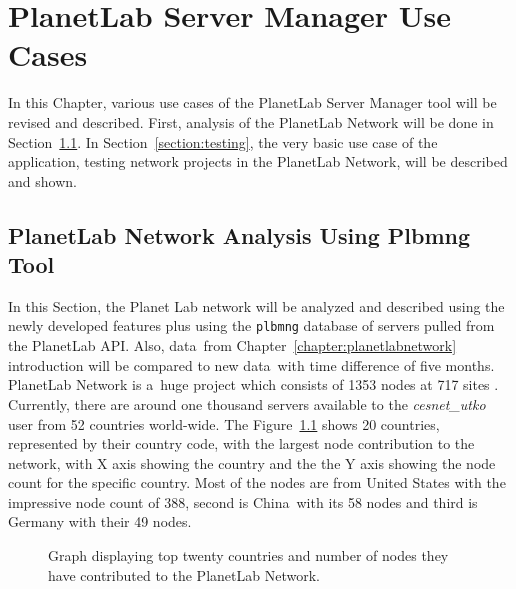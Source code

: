 {{{{{{{\chapter{PlanetLab Server Manager Use Cases}
\label{chapter:usecase}
In this Chapter, various use cases of the PlanetLab Server Manager tool will be revised and described. First, analysis of the PlanetLab Network will be done in Section~\ref{section:analysis}. In Section~\ref{section:testing}, the very basic use case of the application, testing network projects in the PlanetLab Network, will be described and shown.

\section{PlanetLab Network Analysis Using Plbmng Tool}
\label{section:analysis}
In this Section, the Planet Lab network will be analyzed and described using the newly developed features plus using the \texttt{plbmng} database of servers pulled from the PlanetLab API. Also, data~from Chapter~\ref{chapter:planetlabnetwork} introduction will be compared to new data~with time difference of five months.\\
PlanetLab Network is a~huge project which consists of 1353 nodes at 717 sites \cite{planetlabmain}. Currently, there are around one thousand servers available to the \textit{cesnet\_utko} user from 52 countries world-wide. The Figure~\ref{fig:allcountriesgraph} shows 20 countries, represented by their country code, with the largest node contribution to the network, with X axis showing the country and the the Y axis showing the node count for the specific country. Most of the nodes are from United States with the impressive node count of 388, second is China~with its 58 nodes and third is Germany with their 49 nodes. 

\begin{figure}[H]
	\centering
	\caption{Graph displaying top twenty countries and number of nodes they have contributed to the PlanetLab Network.}
	\label{fig:allcountriesgraph}
\end{figure}

}}}}}}}
